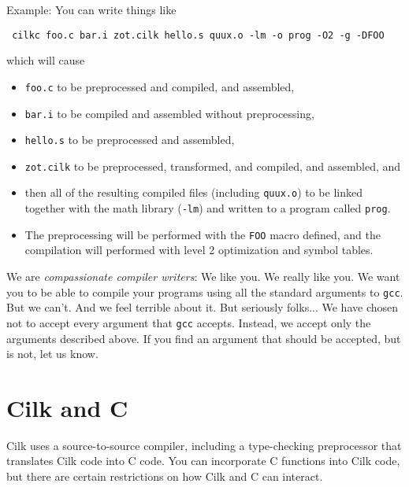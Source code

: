 Example:  You can write things like
\begin{verbatim}
 cilkc foo.c bar.i zot.cilk hello.s quux.o -lm -o prog -O2 -g -DFOO
\end{verbatim}
which will cause 
\begin{itemize}
\item \texttt{foo.c} to be preprocessed and compiled, and assembled,
\item \texttt{bar.i} to be compiled and assembled without preprocessing,
\item \texttt{hello.s} to be preprocessed and assembled,
\item \texttt{zot.cilk} to be preprocessed, transformed, and compiled, and assembled, and
\item then all of the resulting compiled files (including
\texttt{quux.o}) to be linked together with the math library
(\texttt{-lm}) and written to a program called \texttt{prog}.
\item The preprocessing will be performed with the \texttt{FOO} macro defined, and the compilation will performed with level 2 optimization and symbol tables.
\end{itemize}

We are {\em compassionate compiler writers}: We like you.  We really
like you. We want you to be able to compile your programs using all
the standard arguments to \texttt{gcc}.  But we can't.  And we feel
terrible about it.  But seriously folks... We have chosen not to
accept every argument that \texttt{gcc} accepts.  Instead, we accept
only the arguments described above.  If you find an argument that
should be accepted, but is not, let us know.


\section{Cilk and C}
\label{sec:cilk-c}

Cilk uses a source-to-source compiler, including a type-checking
preprocessor that translates Cilk code into C code.  You can
incorporate C functions into Cilk code, but there are certain
restrictions on how Cilk and C can interact.  


